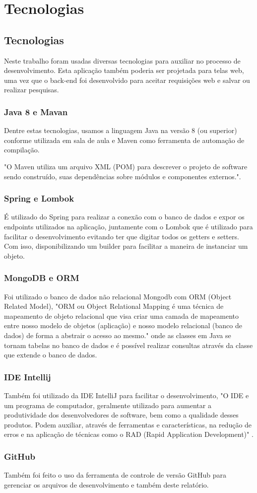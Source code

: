 \chapter{Tecnologias}\label{cap_tecnologias}

\section{Tecnologias}
Neste trabalho foram usadas diversas tecnologias para auxiliar no processo de desenvolvimento. Esta aplicação também poderia ser projetada para telas web, uma vez que o back-end foi desenvolvido para aceitar requisições web e salvar ou realizar pesquisas. 

\subsection{Java 8 e Mavan}
Dentre estas tecnologias, usamos a linguagem Java na versão 8 (ou superior) conforme utilizada em sala de aula e Maven como ferramenta de automação de compilação.

 "O Maven utiliza um arquivo XML (POM) para descrever o projeto de software sendo construído, suas dependências sobre módulos e componentes externos."\cite{maven}. 

\subsection{Spring e Lombok}
É utilizado do Spring para realizar a conexão com o banco de dados e expor os endpoints utilizados na aplicação, juntamente com o Lombok que é utilizado para facilitar o desenvolvimento evitando ter que digitar todos os getters e setters. Com isso, disponibilizando um builder para facilitar a maneira de instanciar um objeto.

\subsection{MongoDB e ORM}
Foi utilizado o banco de dados não relacional Mongodb com ORM (Object Related Model), "ORM ou Object Relational Mapping é uma técnica de mapeamento de objeto relacional que visa criar uma camada de mapeamento entre nosso modelo de objetos (aplicação) e nosso modelo relacional (banco de dados) de forma a abstrair o acesso ao mesmo."\cite{orm} onde as classes em Java se tornam tabelas no banco de dados e é possível realizar consultas através da classe que extende o banco de dados.

\subsection{IDE Intellij}
Também foi utilizado da IDE IntelliJ para facilitar o desenvolvimento, "O IDE e um programa de computador, geralmente utilizado para aumentar a produtividade dos desenvolvedores de software, bem como a qualidade desses produtos. Podem auxiliar,
através de ferramentas e características, na redução de erros e na aplicação de técnicas
como o RAD (Rapid Application Development)" \cite{ide}.

\subsection{GitHub}
Também foi feito o uso da ferramenta de controle de versão GitHub para gerenciar os arquivos de desenvolvimento e também deste relatório.

